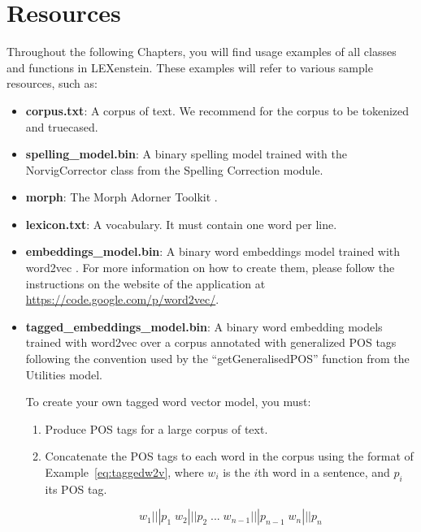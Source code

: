 \chapter{Resources}
\label{chapterresources}

Throughout the following Chapters, you will find usage examples of all classes and functions in LEXenstein. These examples will refer to various sample resources, such as:

\begin{itemize}
	\item \textbf{corpus.txt}: A corpus of text. We recommend for the corpus to be tokenized and truecased.
	
	\item \textbf{spelling\_model.bin}: A binary spelling model trained with the NorvigCorrector class from the Spelling Correction module.
	
	\item \textbf{morph}: The Morph Adorner Toolkit \cite{Paetzold15mat}.
	
	\item \textbf{lexicon.txt}: A vocabulary. It must contain one word per line.
	
	\item \textbf{embeddings\_model.bin}: A binary word embeddings model trained with word2vec \cite{mikolov2013efficient}. For more information on how to create them, please follow the instructions on the website of the application at \url{https://code.google.com/p/word2vec/}.
	
	\item \textbf{tagged\_embeddings\_model.bin}: A binary word embedding models trained with word2vec \cite{mikolov2013efficient} over a corpus annotated with generalized POS tags following the convention used by the ``getGeneralisedPOS'' function from the Utilities model.
	
	To create your own tagged word vector model, you must:
	
		\begin{enumerate}
			\item Produce POS tags for a large corpus of text.
			\item Concatenate the POS tags to each word in the corpus using the format of Example~\ref{eq:taggedw2v}, where $w_{i}$ is the $i$th word in a sentence, and $p_{i}$ its POS tag.
			
			\begin{equation}
				\label{eq:taggedw2v}
				w_{1}|||p_{1}\; w_{2}|||p_{2}\;  ...\; w_{n-1}|||p_{n-1}\; w_{n}|||p_{n}
				\end{equation}
				

\end{enumerate}
\end{itemize}
